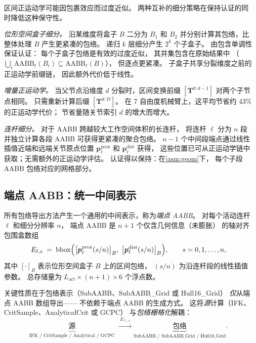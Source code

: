 \documentclass[journal]{IEEEtran}
\newcommand{\AABB}{\text{AABB}}
\newcommand{\bT}{\mathbf{T}}
\begin{document}
区间正运动学可能因包裹效应而过度近似。
两种互补的细分策略在保持认证的同时降低这种保守性。

\emph{位形空间盒子细分。}
沿某维度将盒子 $B$ 二分为 $B_1$ 和 $B_2$
并分别计算其包络，比整体处理 $B$ 产生更紧凑的包络。
递归 $k$ 层细分产生 $2^k$ 个子盒子。
由包含单调性保证认证：
每个子盒子包络是有效的过度近似，
其并集包含在原始结果中
（$\bigcup_i \AABB_\ell(B_i) \subseteq \AABB_\ell(B)$），
但逐点更紧凑。
子盒子共享分裂维度之前的正运动学前缀链，
因此额外代价低于线性。

\emph{增量正运动学。}
当父节点沿维度 $d$ 分裂时，区间变换前缀
$[\bT^{0:d-1}]$ 对两个子节点相同。
只需重新计算后缀 $[\bT^{d:D}]$。
在 7 自由度机械臂上，这平均节省约 43\% 的正运动学代价；
节省量随关节索引 $d$ 的增大而增大。

\emph{连杆细分。}
对于 AABB 跨越较大工作空间体积的长连杆，
将连杆 $\ell$ 分为 $n$ 段并独立计算各段 AABB
可获得更紧凑的聚合包络。
$n{-}1$ 个中间段端点通过线性插值近端和远端关节原点位置
$\bm{p}_\ell^{\mathrm{prox}}$ 和 $\bm{p}_\ell^{\mathrm{dist}}$ 获得，
这些位置已可从正运动学链中获取；无需额外的正运动学评估。
认证得以保持：在\cref{asm:geom}下，
每个子段 AABB 包络对应的网格部分。

\subsection{端点 AABB：统一中间表示}\label{sec:endpoint_aabb}

所有包络导出方法产生一个通用的中间表示，称为\emph{端点 AABB}。
对每个活动连杆 $\ell$ 和细分分辨率 $n$，
端点 AABB 是 $n{+}1$ 个仅含几何信息（未膨胀）
的轴对齐包围盒数组
\begin{equation}\label{eq:ep_aabb}
  E_{\ell,s} \;=\;
  \mathrm{bbox}\Bigl(
    \bigl[\bm{p}_\ell^\mathrm{prox}(s/n)\bigr]_B,\;
    \bigl[\bm{p}_\ell^\mathrm{dist}(s/n)\bigr]_B
  \Bigr),
  \qquad s = 0,1,\ldots,n,
\end{equation}
其中 $[\cdot]_B$ 表示位形空间盒子 $B$ 上的区间包络，
$(s/n)$ 为沿连杆段的线性插值参数。
总存储量为 $L_\text{act} \times (n{+}1) \times 6$ 个浮点数。

关键性质在于包络表示（SubAABB、SubAABB\_Grid 或 Hull16\_Grid）
\emph{仅}从端点 AABB 数组导出——
不依赖于端点 AABB 的生成方式。
这将\emph{源}计算（IFK、CritSample、AnalyticalCrit 或 GCPC）
与\emph{包络栅格化}解耦：
\begin{equation}\label{eq:pipeline}
  \underbrace{\text{源}}_{\text{IFK / CritSample / Analytical / GCPC}}
  \;\xrightarrow{\;E_{\ell,s}\;}
  \underbrace{\text{包络}}_{\text{SubAABB / SubAABB\_Grid / Hull16\_Grid}}.
\end{equation}
\end{document}

